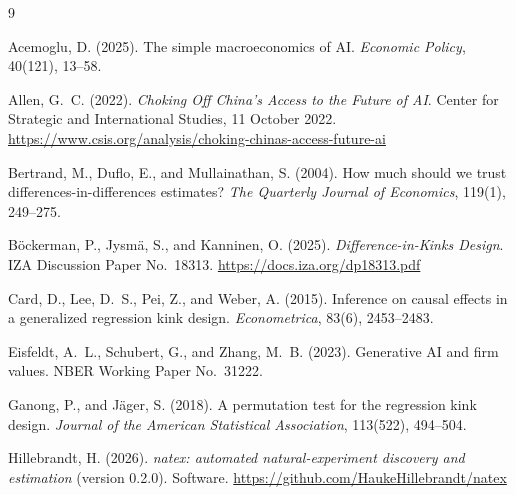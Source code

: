 \documentclass[11pt]{article}
\begin{document}
\footnotesize
\begin{thebibliography}{9}
\setlength{\itemsep}{2pt}\setlength{\parskip}{0pt}

Acemoglu, D. (2025).
The simple macroeconomics of AI.
\emph{Economic Policy}, 40(121), 13--58.

Allen, G.~C. (2022).
\emph{Choking Off China's Access to the Future of AI}.
Center for Strategic and International Studies, 11 October 2022.
\url{https://www.csis.org/analysis/choking-chinas-access-future-ai}

Bertrand, M., Duflo, E., and Mullainathan, S. (2004).
How much should we trust differences-in-differences estimates?
\emph{The Quarterly Journal of Economics}, 119(1), 249--275.

B\"ockerman, P., Jysm\"a, S., and Kanninen, O. (2025).
\emph{Difference-in-Kinks Design}.
IZA Discussion Paper No.~18313.
\url{https://docs.iza.org/dp18313.pdf}

Card, D., Lee, D.~S., Pei, Z., and Weber, A. (2015).
Inference on causal effects in a generalized regression kink design.
\emph{Econometrica}, 83(6), 2453--2483.

Eisfeldt, A.~L., Schubert, G., and Zhang, M.~B. (2023).
Generative AI and firm values.
NBER Working Paper No.~31222.

Ganong, P., and J\"ager, S. (2018).
A permutation test for the regression kink design.
\emph{Journal of the American Statistical Association}, 113(522), 494--504.

Hillebrandt, H. (2026).
\emph{natex: automated natural-experiment discovery and estimation} (version
0.2.0). Software.
\url{https://github.com/HaukeHillebrandt/natex}

\end{thebibliography}
\end{document}
